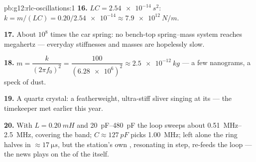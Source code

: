 \begin{solution}{pb:g12:rlc-oscillations:1}
\textbf{16.} $LC = \qty{2.54e-14}{s^2}$: $k = m/(LC) =
0.20/\num{2.54e-14} \approx \qty{7.9e12}{N/m}$.

\textbf{17.} About $10^8$ times the car spring: no bench-top
spring--mass system reaches megahertz --- everyday stiffnesses and
masses are hopelessly slow.

\textbf{18.} $m = \dfrac{k}{(2\pi f_0)^2} = \dfrac{100}
{(\num{6.28e6})^2} \approx \qty{2.5e-12}{kg}$ --- a few nanograms, a
speck of dust.

\textbf{19.} A quartz crystal: a featherweight, ultra-stiff sliver
singing at its  --- the timekeeper met earlier this
year.

\textbf{20.} With $L = \qty{0.20}{mH}$ and \qtyrange{20}{480}{pF} the
loop sweeps about \qtyrange{0.51}{2.5}{MHz}, covering the band;
$C \approx \qty{127}{pF}$ picks \qty{1.00}{MHz}; left alone the ring
halves in $\approx \qty{17}{\micro s}$, but the station's own ,
resonating in step, re-feeds the loop --- the news plays on the 
of the  itself.
\end{solution}
